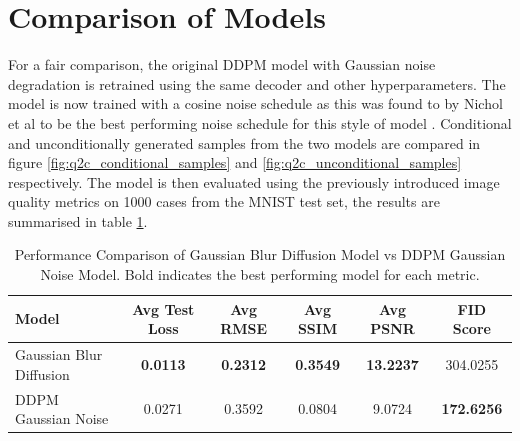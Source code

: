 \documentclass[11pt]{article}
\begin{document}
\section{Comparison of Models}
For a fair comparison, the original DDPM model with Gaussian noise degradation is retrained using the same decoder and other hyperparameters. The model is now trained with a cosine noise schedule as this was found to by Nichol et al to be the best performing noise schedule for this style of model \cite{nichol2021improved}. Conditional and unconditionally generated samples from the two models are compared in figure \ref{fig:q2c_conditional_samples} and \ref{fig:q2c_unconditional_samples} respectively. The model is then evaluated using the previously introduced image quality metrics on 1000 cases from the MNIST test set, the results are summarised in table \ref{tab:q2c_model_comparison}.
\begin{table}[h]
    \centering
    \begin{tabular}{lccccc}
    \hline
    Model & Avg Test Loss & Avg RMSE & Avg SSIM & Avg PSNR & FID Score \\
    \hline
    Gaussian Blur Diffusion & \textbf{0.0113} & \textbf{0.2312} & \textbf{0.3549} & \textbf{13.2237} & 304.0255 \\
    DDPM Gaussian Noise & 0.0271 & 0.3592 & 0.0804 & 9.0724 & \textbf{172.6256} \\
    \hline
    \end{tabular}
    \caption{Performance Comparison of Gaussian Blur Diffusion Model vs DDPM Gaussian Noise Model. Bold indicates the best performing model for each metric.}
    \label{tab:q2c_model_comparison}
\end{table}
\end{document}
